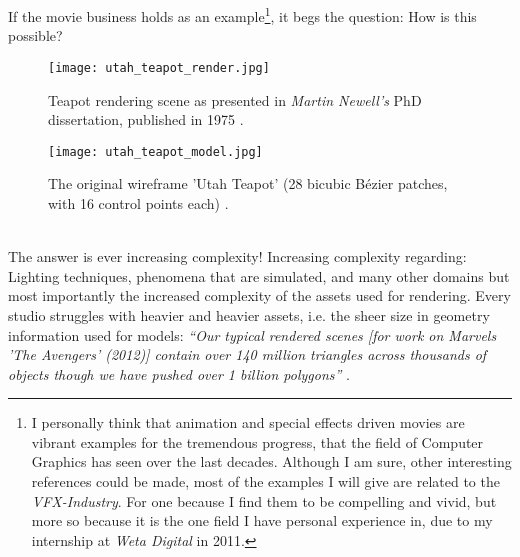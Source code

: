 If the movie business holds as an example\footnote{ I personally think that animation and special effects driven movies are vibrant examples for the tremendous progress, that the field of Computer Graphics has seen over the last decades. Although I am sure, other interesting references could be made, most of the examples I will give are related to the \textit{VFX-Industry}. For one because I find them to be compelling and vivid, but more so because it is the one field I have personal experience in, due to my internship at \textit{Weta Digital} in 2011.}, it begs the question: How is this possible?
\begin{figure}[ht]
\begin{minipage}[b]{0.475\linewidth} \centering
\texttt{[image: utah\_teapot\_render.jpg]}
\caption{Teapot rendering scene as presented in \textit{Martin Newell's} PhD dissertation, published in 1975 \citep[cf.][]{Torrence2006}.}
\label{fig:utah_teapot_render}
\end{minipage}
\hspace{0.35cm}
\begin{minipage}[b]{0.475\linewidth}
\centering
\texttt{[image: utah\_teapot\_model.jpg]}
\caption{The original wireframe 'Utah Teapot' (28 bicubic Bézier patches, with 16 control points each) \citep[cf.][]{Newell1975a}.}
\label{fig:utah_teapot_model}
\end{minipage}
\end{figure}\\
The answer is ever increasing complexity!
Increasing complexity regarding: Lighting techniques, phenomena that are simulated, and many other domains but most importantly the increased complexity of the assets used for rendering.
Every studio struggles with heavier and heavier assets, i.e. the sheer size in geometry information used for models:
\textit{``Our typical rendered scenes [for work on Marvels 'The Avengers' (2012)] contain over 140 million triangles across thousands of objects though we have pushed over 1 billion polygons''} \citep[Votch Levi, CTO Whiskytree, cited in:][]{Seymour2012}.

